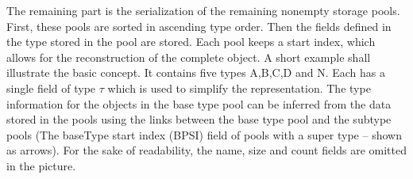 The remaining part is the serialization of the remaining nonempty storage pools. First, these pools are sorted in ascending type order. Then the fields defined in the type stored in the pool are stored. Each pool keeps a start index, which allows for the reconstruction of the complete object. A short example shall illustrate the basic concept. It contains five types A,B,C,D and N. Each has a single field of type $\tau$ which is used to simplify the representation. The type information for the objects in the base type pool can be inferred from the data stored in the pools using the links between the base type pool and the subtype pools (The \gls{baseType} start index (BPSI) field of pools with a super type -- shown as arrows). For the sake of readability, the name, size and count fields are omitted in the picture.

